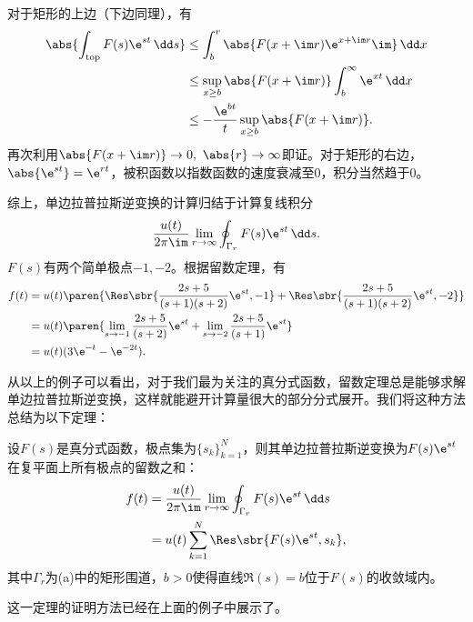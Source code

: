 \begin{example}
    对于矩形的上边（下边同理），有
    \begin{align}
        \abs{\int_{\mathrm{top}}F(s)\e^{st}\,\dd s}
        &\leq\int_{b}^{r}\abs{F(x+\im r)\e^{x+\im r}\im}\,\dd x\nonumber\\
        &\leq\sup_{x\geq b}\abs{F(x+\im r)}\int_{b}^{\infty}\e^{xt}\,\dd x\nonumber\\
        &\leq-\frac{\e^{bt}}{t}\sup_{x\geq b}\abs{F(x+\im r)}.
    \end{align}
    再次利用$\abs{F(x+\im r)}\to 0,\ \abs{r}\to\infty$即证。对于矩形的右边，$\abs{\e^{st}}=\e^{rt}$，被积函数以指数函数的速度衰减至$0$，积分当然趋于$0$。

    综上，单边拉普拉斯逆变换的计算归结于计算复线积分
    \begin{equation}
        \frac{u(t)}{2\pi\im}\lim_{r\to\infty}\oint_{\Gamma_r}F(s)\e^{st}\,\dd s.
    \end{equation}
    $F(s)$有两个简单极点$-1,-2$。根据留数定理，有
    \begin{align}
        f(t)&=u(t)\paren{\Res\sbr{\frac{2s+5}{(s+1)(s+2)}\e^{st},-1}+\Res\sbr{\frac{2s+5}{(s+1)(s+2)}\e^{st},-2}}\nonumber\\
        &=u(t)\paren{\lim_{s\to -1}\frac{2s+5}{(s+2)}\e^{st}+\lim_{s\to -2}\frac{2s+5}{(s+1)}\e^{st}}\nonumber\\
        &=u(t)(3\e^{-t}-\e^{-2t}).
    \end{align}
\end{example}

从以上的例子可以看出，对于我们最为关注的真分式函数，留数定理总是能够求解单边拉普拉斯逆变换，这样就能避开计算量很大的部分分式展开。我们将这种方法总结为以下定理：
\begin{theorem}
    设$F(s)$是真分式函数，极点集为$\{s_k\}_{k=1}^{N}$，则其单边拉普拉斯逆变换为$F(s)\e^{st}$在复平面上所有极点的留数之和：
    \begin{align}
        f(t)&=\frac{u(t)}{2\pi\im}\lim_{r\to\infty}\oint_{\Gamma_r}F(s)\e^{st}\,\dd s\nonumber\\
        &=u(t)\sum_{k=1}^{N}\Res\sbr{F(s)\e^{st},s_k},
    \end{align}
    其中$\Gamma_r$为(a)中的矩形围道，$b>0$使得直线$\Re(s)=b$位于$F(s)$的收敛域内。
\end{theorem}

这一定理的证明方法已经在上面的例子中展示了。

